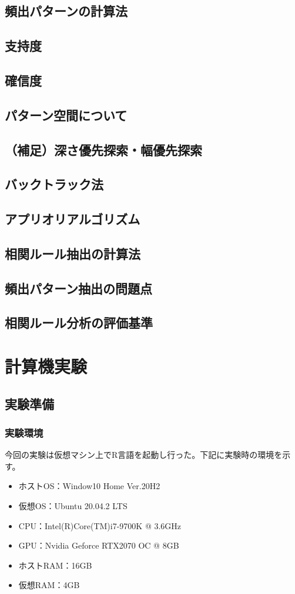 \documentclass[dvipdfmx]{jsarticle}
\begin{document}
{\subsection{頻出パターンの計算法}
\subsection{支持度}
\subsection{確信度}
\subsection{パターン空間について}
\subsection{（補足）深さ優先探索・幅優先探索}
\subsection{バックトラック法}
\subsection{アプリオリアルゴリズム}
\subsection{相関ルール抽出の計算法}
\subsection{頻出パターン抽出の問題点}
\subsection{相関ルール分析の評価基準}

\section{計算機実験}
\subsection{実験準備}
  \subsubsection{実験環境}
  今回の実験は仮想マシン上でR言語を起動し行った。下記に実験時の環境を示す。
  \begin{itemize}
    \item ホストOS：Window10 Home Ver.20H2
    \item 仮想OS：Ubuntu 20.04.2 LTS
    \item CPU：Intel(R)Core(TM)i7-9700K @ 3.6GHz
    \item GPU：Nvidia Geforce RTX2070 OC @ 8GB
    \item ホストRAM：16GB
    \item 仮想RAM：4GB
  \end{itemize}
}
\end{document}
